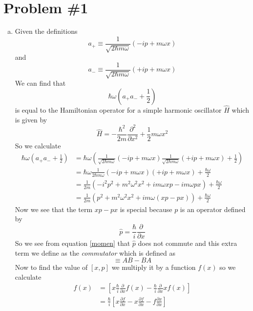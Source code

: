 \documentclass[11pt]{article}
\numberwithin{equation}{section}
\begin{document}


\section{Problem \#1}
\begin{enumerate}[(a)]
\item
Given the definitions 
$$a_+\equiv \frac{1}{\sqrt{2\hbar m\omega}}(-ip+m\omega x)$$
and
$$a_-\equiv \frac{1}{\sqrt{2\hbar m\omega}}(+ip+m\omega x)$$
We can find that
$$\hbar\omega\left(a_+a_-+\frac{1}{2}\right)$$ 
is equal to the Hamiltonian operator for a simple harmonic oscillator $\hat{H}$ which is given by
\begin{equation}
\hat{H} = -\frac{\hbar^2}{2m}\frac{\partial^2}{\partial x^2} + \frac{1}{2}m\omega x^2
\label{hamil}
\end{equation}
So we calculate 
\begin{align*}
\hbar\omega\left(a_+a_-+\frac{1}{2}\right) &= \hbar\omega\left(\frac{1}{\sqrt{2\hbar m\omega}}(-ip+m\omega x)\frac{1}{\sqrt{2\hbar m\omega}}(+ip+m\omega x) + \frac{1}{2}\right)\\
&= \hbar\omega\frac{1}{2\hbar m\omega}(-ip+m\omega x)(+ip+m\omega x)+\frac{\hbar\omega}{2} \\
&= \frac{1}{2m}\left(-i^2p^2+m^2\omega^2 x^2+im\omega xp-im\omega px\right) + \frac{\hbar\omega}{2}\\
&= \frac{1}{2m}\left(p^2+m^2\omega^2 x^2+im\omega(xp-px)\right) + \frac{\hbar\omega}{2}
\end{align*}
Now we see that the term $xp-px$ is special because $p$ is an operator defined by
\begin{equation}
\hat{p} = \frac{\hbar}{i}\frac{\partial}{\partial x}
\label{momen}
\end{equation}
So we see from equation \ref{momen} that $\hat{p}$ does not commute and this extra term we define as the \emph{commutator} which is defined as
\begin{equation}
[A,B]\equiv AB-BA
\label{commute}
\end{equation}
Now to find the value of $[x,p]$ we multiply it by a function $f(x)$ so we calculate
\begin{align*}
[x,p]f(x) &= \left[x\frac{\hbar}{i}\frac{\partial}{\partial x}f(x)-\frac{\hbar}{i}\frac{\partial}{\partial x}xf(x)\right]\\
&= \frac{\hbar}{i}\left[x\frac{\partial f}{\partial x}-x\frac{\partial f}{\partial x}-f\frac{\partial x}{\partial x}\right]\\

\end{align*}
\end{enumerate}
\end{document}
